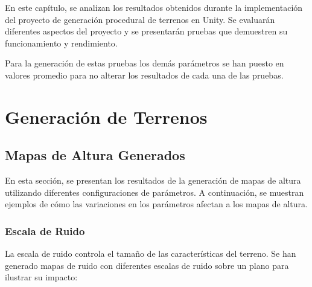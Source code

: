 En este capítulo, se analizan los resultados obtenidos durante la implementación del proyecto de generación procedural de terrenos en Unity. Se evaluarán diferentes aspectos del proyecto y se presentarán pruebas que demuestren su funcionamiento y rendimiento.

Para la generación de estas pruebas los demás parámetros se han puesto en valores promedio para no alterar los resultados de cada una de las pruebas.

\section{Generación de Terrenos}

\subsection{Mapas de Altura Generados}

En esta sección, se presentan los resultados de la generación de mapas de altura utilizando diferentes configuraciones de parámetros. A continuación, se muestran ejemplos de cómo las variaciones en los parámetros afectan a los mapas de altura.

\subsubsection{Escala de Ruido}

La escala de ruido controla el tamaño de las características del terreno. Se han generado mapas de ruido con diferentes escalas de ruido sobre un plano para ilustrar su impacto:

